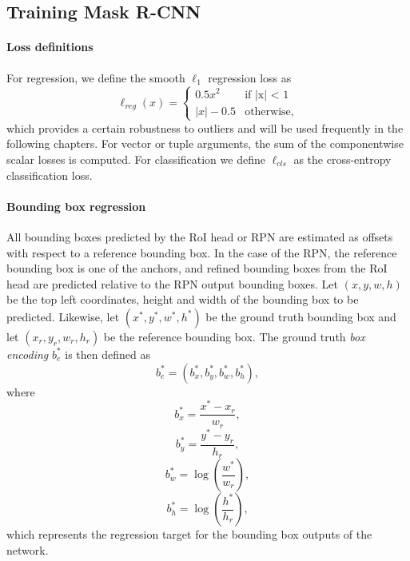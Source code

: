 \subsection{Training Mask R-CNN}
\paragraph{Loss definitions}
For regression, we define the smooth $\ell_1$ regression loss as
\begin{equation}
\ell_{reg}(x) =
\begin{cases}
0.5x^2 &\text{if |x| < 1} \\
|x| - 0.5 &\text{otherwise,}
\end{cases}
\end{equation}
which provides a certain robustness to outliers and will be used
frequently in the following chapters. For vector or tuple arguments, the sum of the componentwise scalar
losses is computed.
For classification we define $\ell_{cls}$ as the cross-entropy classification loss.

\label{ssec:rcnn_techn}
\paragraph{Bounding box regression}
All bounding boxes predicted by the RoI head or RPN are estimated as offsets
with respect to a reference bounding box. In the case of the RPN,
the reference bounding box is one of the anchors, and refined bounding boxes from the RoI head are
predicted relative to the RPN output bounding boxes.
Let $(x, y, w, h)$ be the top left coordinates, height and width of the bounding box
to be predicted. Likewise, let $(x^*, y^*, w^*, h^*)$ be the ground truth bounding
box and let $(x_r, y_r, w_r, h_r)$ be the reference bounding box.
The ground truth \emph{box encoding} $b_e^*$ is then defined as
\begin{equation}
b_e^* = (b_x^*, b_y^*, b_w^*, b_h^*),
\end{equation}
where
\begin{equation*}
b_x^* = \frac{x^* - x_r}{w_r},
\end{equation*}
\begin{equation*}
b_y^* = \frac{y^* - y_r}{h_r},
\end{equation*}
\begin{equation*}
b_w^* = \log \left( \frac{w^*}{w_r} \right),
\end{equation*}
\begin{equation*}
b_h^* = \log \left( \frac{h^*}{h_r} \right),
\end{equation*}
which represents the regression target for the bounding box
outputs of the network.

